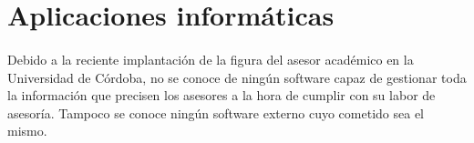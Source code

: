 \section{Aplicaciones informáticas}

\paragraph{}Debido a la reciente implantación de la figura del asesor académico
en la Universidad de Córdoba, no se conoce de ningún software capaz de
gestionar toda la información que precisen los asesores a la hora de cumplir
con su labor de asesoría. Tampoco se conoce ningún software externo cuyo
cometido sea el mismo.
